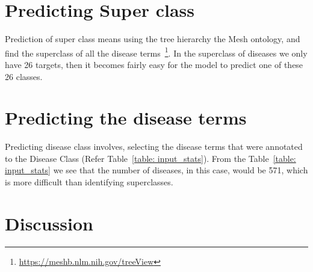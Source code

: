 \section{Predicting Super class}
Prediction of super class means using the tree hierarchy the Mesh ontology, and find the superclass of all the disease terms~\footnote{\url{https://meshb.nlm.nih.gov/treeView}}. In the superclass of diseases we only have 26 targets, then it becomes fairly easy for the model to predict one of these 26 classes. 



\section{Predicting the disease terms}
Predicting disease class involves, selecting the disease terms that were annotated to the Disease Class (Refer Table~\ref{table: input_stats}). From the Table~\ref{table: input_stats} we see that the number of diseases, in this case, would be 571, which is more difficult than identifying superclasses. 

\section{Discussion}
\fi

